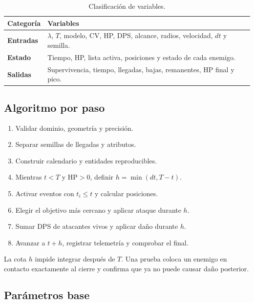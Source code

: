 \documentclass[11pt,a4paper]{article}
\begin{document}
\begin{table}[H]
\centering
\caption{Clasificación de variables.}
\begin{tabularx}{\textwidth}{>{\bfseries}p{2.7cm}X}
\toprule
Categoría & Variables \\
\midrule
Entradas & $\lambda$, $T$, modelo, CV, HP, DPS, alcance, radios, velocidad,
$dt$ y semilla. \\
Estado & Tiempo, HP, lista activa, posiciones y estado de cada enemigo. \\
Salidas & Supervivencia, tiempo, llegadas, bajas, remanentes, HP final y pico. \\
\bottomrule
\end{tabularx}
\end{table}

\subsection{Algoritmo por paso}

\begin{enumerate}
  \item Validar dominio, geometría y precisión.
  \item Separar semillas de llegadas y atributos.
  \item Construir calendario y entidades reproducibles.
  \item Mientras $t<T$ y HP$>0$, definir $h=\min(dt,T-t)$.
  \item Activar eventos con $t_i\leq t$ y calcular posiciones.
  \item Elegir el objetivo más cercano y aplicar ataque durante $h$.
  \item Sumar DPS de atacantes vivos y aplicar daño durante $h$.
  \item Avanzar a $t+h$, registrar telemetría y comprobar el final.
\end{enumerate}

La cota $h$ impide integrar después de $T$. Una prueba coloca un enemigo en
contacto exactamente al cierre y confirma que ya no puede causar daño posterior.

\subsection{Parámetros base}
\end{document}
